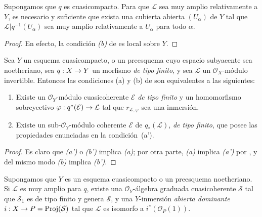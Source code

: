 \documentclass[oneside,10pt]{amsart}
\makeatletter
\newcommand{\ega@arrow}[2]{\mathchoice{#1}{#2}{#2}{#2}}
\renewcommand{\to}{\ega@arrow{\longrightarrow}{\rightarrow}}
\let\EGAOriginalLabel\label
\renewcommand{\label}[1]{\phantomsection\EGAOriginalLabel{#1}}
\makeatother
\begin{document}
\begin{corollary}[4.4.5]
\label{II.4.4.5-fr}
Supongamos que $q$ es cuasicompacto.
Para que $\mathcal{L}$ sea muy amplio relativamente a $Y$, es necesario y suficiente que exista una cubierta abierta $(U_\alpha)$ de $Y$ tal que $\mathcal{L}|q^{-1}(U_\alpha)$ sea muy amplio relativamente a $U_\alpha$ para todo $\alpha$.
\end{corollary}

\begin{proof}
En efecto, la condición \emph{(b)} de  es local sobre $Y$.
\end{proof}

\begin{proposition}[4.4.6]
\label{II.4.4.6-fr}
Sea $Y$ un esquema cuasicompacto, o un preesquema cuyo espacio subyacente sea noetheriano, sea $q:X\to Y$ un morfismo \emph{de tipo finito}, y sea $\mathcal{L}$ un $\mathcal{O}_X$-módulo invertible.
Entonces las condiciones \textup{(a)} y \textup{(b)} de  son equivalentes a las siguientes:
\begin{enumerate}
  \item[\rm{(a')}] Existe un $\mathcal{O}_Y$-módulo cuasicoherente $\mathcal{E}$ \emph{de tipo finito} y un homomorfismo sobreyectivo $\varphi:q^*(\mathcal{E})\to\mathcal{L}$ tal que $r_{\mathcal{L},\varphi}$ sea una inmersión.
  \item[\rm{(b')}] Existe un sub-$\mathcal{O}_Y$-módulo coherente $\mathcal{E}$ de $q_*(\mathcal{L})$, \emph{de tipo finito}, que posee las propiedades enunciadas en la condición~\textup{(a')}.
\end{enumerate}
\end{proposition}

\begin{proof}
Es claro que \emph{(a')} o \emph{(b')} implica \emph{(a)};
por otra parte, \emph{(a)} implica \emph{(a')} por , y del mismo modo \emph{(b)} implica \emph{(b')}.
\end{proof}

\begin{corollary}[4.4.7]
\label{II.4.4.7-fr}
Supongamos que $Y$ es un esquema cuasicompacto o un preesquema noetheriano.
Si $\mathcal{L}$ es muy amplio para $q$, existe una $\mathcal{O}_Y$-álgebra graduada cuasicoherente $\mathcal{S}$ tal que $\mathcal{S}_1$ es de tipo finito y genera $\mathcal{S}$, y una $Y$-inmersión \emph{abierta dominante} $i:X\to P=\operatorname{Proj}(\mathcal{S})$ tal que $\mathcal{L}$ es isomorfo a $i^*(\mathcal{O}_P(1))$.
\end{corollary}
\end{document}
